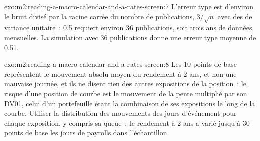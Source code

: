 \begin{solution}{exo:m2:reading-a-macro-calendar-and-a-rates-screen:7}
L'erreur type est d'environ le bruit divisé par la racine carrée du nombre de publications,
$3/\sqrt n$ avec des  de variance unitaire~: 0.5 requiert environ 36 publications, soit trois ans de
données mensuelles. La simulation avec 36 publications donne une erreur type moyenne de 0.51.
\end{solution}

\begin{solution}{exo:m2:reading-a-macro-calendar-and-a-rates-screen:8}
Les 10 points de base représentent le mouvement absolu moyen du rendement à 2 ans, et non une mauvaise journée, et ils
ne disent rien des autres expositions de la position~: le risque d'une position de courbe est le mouvement de la pente
multiplié par son DV01, celui d'un portefeuille étant la combinaison de ses expositions le long de la courbe. Utiliser
la distribution des mouvements des jours d'événement pour chaque exposition, y compris sa queue~: le
rendement à 2 ans a varié jusqu'à 30 points de base les jours de payrolls dans l'échantillon.
\end{solution}

